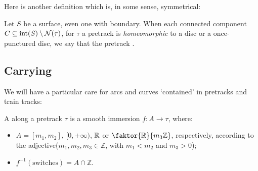 Here is another definition which is, in some sense, symmetrical:
\begin{defin}
Let $S$ be a surface, even one with boundary. When each connected component $C\subseteq \mathrm{int}(S)\setminus{\mathcal N}(\tau)$, for $\tau$ a pretrack is \emph{homeomorphic} to a disc or a once-punctured disc, we say that the pretrack .
\end{defin}

\subsection{Carrying}

We will have a particular care for arcs and curves `contained' in pretracks and train tracks:
\begin{defin}
A  along a pretrack $\tau$ is a smooth immersion $f:A\rightarrow \tau$, where:
\begin{itemize}
\item $A=[m_1,m_2]$, $[0,+\infty)$, $\mathbb R$ or $\faktor{\mathbb R}{m_3\mathbb Z}$, respectively, according to the adjective\linebreak ($m_1,m_2,m_3\in\mathbb Z$, with $m_1<m_2$ and $m_3>0$);
\item $f^{-1}(\text{switches})=A\cap\mathbb Z$.
\end{itemize}
\end{defin}

